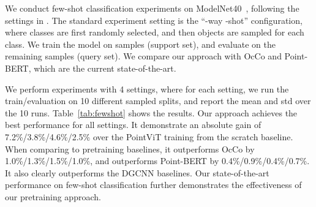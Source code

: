 \documentclass[runningheads]{llncs}
\begin{document}
We conduct few-shot classification experiments on ModelNet40~\cite{wu20153d}, following the settings in \cite{yu2021point}.  The standard experiment setting is the ``-way -shot'' configuration, where  classes are first randomly selected, and then  objects are sampled for each class.  We train the model on  samples (support set), and evaluate on the remaining  samples (query set). We compare our approach with OcCo and Point-BERT, which are the current state-of-the-art.

We perform experiments with 4 settings, where for each setting, we run the train/evaluation on 10 different sampled splits, and report the mean and std over the 10 runs.  Table~\ref{tab:fewshot} shows the results.  Our approach achieves the best performance for all settings.  It demonstrate an absolute gain of 7.2\%/3.8\%/4.6\%/2.5\% over the PointViT training from the scratch baseline.  When comparing to pretraining baselines, it outperforms OcCo by 1.0\%/1.3\%/1.5\%/1.0\%, and outperforms Point-BERT by 0.4\%/0.9\%/0.4\%/0.7\%.  It also clearly outperforms the DGCNN baselines.  Our state-of-the-art performance on few-shot classification further demonstrates the effectiveness of our pretraining approach.
\end{document}
